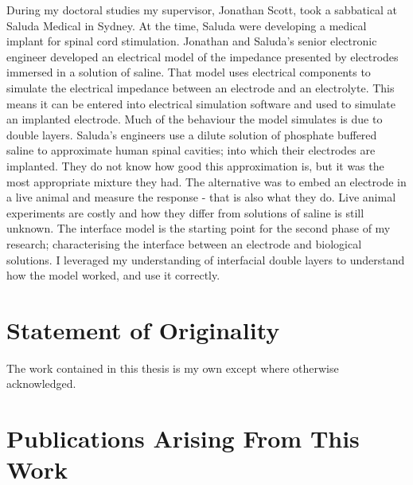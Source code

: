   During my doctoral studies my supervisor, Jonathan Scott, took a sabbatical at Saluda Medical in Sydney.
  At the time, Saluda were developing a medical implant for spinal cord stimulation.
  Jonathan and Saluda's senior electronic engineer developed an electrical model of the impedance presented by electrodes immersed in a solution of saline.
  That model uses electrical components to simulate the electrical impedance between an electrode and an electrolyte.
  This means it can be entered into electrical simulation software and used to simulate an implanted electrode.
  Much of the behaviour the model simulates is due to double layers.
  Saluda's engineers use a dilute solution of phosphate buffered saline to approximate human spinal cavities; into which their electrodes are implanted.
  They do not know how good this approximation is, but it was the most appropriate mixture they had.
  The alternative was to embed an electrode in a live animal and measure the response - that is also what they do.
  Live animal experiments are costly and how they differ from solutions of saline is still unknown.
  The interface model is the starting point for the second phase of my research; characterising the interface between an electrode and biological solutions.
  I leveraged my understanding of interfacial double layers to understand how the model worked, and use it correctly.


\section{Statement of Originality}

  The work contained in this thesis is my own except where otherwise acknowledged.


\section{Publications Arising From This Work}


